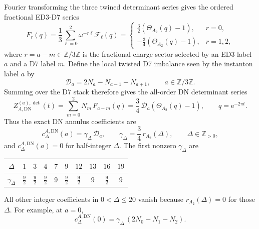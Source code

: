 \documentclass[11pt]{article}
\newcommand{\Z}{\mathbb{Z}}
\newcommand{\DN}{\mathrm{DN}}
\newcommand{\e}{\mathrm{e}}
\begin{document}
Fourier transforming the three twined determinant series gives the ordered fractional
ED3-D7 series
\begin{equation}
  F_r(q)
  =
  \frac13\sum_{\ell=0}^{2}\omega^{-r\ell}\mathcal F_\ell(q)
  =
  \begin{cases}
    \frac32\left(\Theta_{A_2}(q)-1\right), & r=0,\\[3pt]
   -\frac34\left(\Theta_{A_2}(q)-1\right), & r=1,2,
  \end{cases}
  \label{eq:fractional-DN-annulus-A2}
\end{equation}
where \(r=a-m\in\Z/3\Z\) is the fractional charge sector selected by an ED3 label \(a\) and a
D7 label \(m\). Define the local twisted D7 imbalance seen by the instanton label \(a\) by
\begin{equation}
  \mathcal D_a
  =
  2N_a-N_{a-1}-N_{a+1},
  \qquad a\in\Z/3\Z .
  \label{eq:local-D7-imbalance-Da}
\end{equation}
Summing over the D7 stack therefore gives the all-order DN determinant series
\begin{equation}
  Z_{A,\DN}^{(a),\det}(t)
  =
  \sum_{m=0}^{2}N_m\,F_{a-m}(q)
  =
  \frac34\,\mathcal D_a\left(\Theta_{A_2}(q)-1\right),
  \qquad q=\e^{-2\pi t}.
  \label{eq:DN-annulus-A2-closed-form}
\end{equation}
Thus the exact DN annulus coefficients are
\begin{equation}
  c_\Delta^{A,\DN}(a)
  =
  \gamma_\Delta\,\mathcal D_a,
  \qquad
  \gamma_\Delta=\frac34\,r_{A_2}(\Delta),
  \qquad
  \Delta\in\Z_{>0},
  \label{eq:general-DN-annulus-linear-imbalance}
\end{equation}
and \(c_\Delta^{A,\DN}(a)=0\) for half-integer \(\Delta\). The first nonzero
\(\gamma_\Delta\) are
\begin{center}
\begin{tabular}{@{}c|ccccccccc@{}}
\toprule
\(\Delta\) & \(1\) & \(3\) & \(4\) & \(7\) & \(9\) & \(12\) & \(13\) & \(16\) & \(19\) \\
\midrule
\(\gamma_\Delta\) &
\(\frac92\) & \(\frac92\) & \(\frac92\) & \(9\) & \(\frac92\) &
\(\frac92\) & \(9\) & \(\frac92\) & \(9\) \\
\bottomrule
\end{tabular}
\end{center}
All other integer coefficients in \(0<\Delta\le20\) vanish because
\(r_{A_2}(\Delta)=0\) for those \(\Delta\).
For example, at \(a=0\),
\[
  c_\Delta^{A,\DN}(0)
  =
  \gamma_\Delta\,(2N_0-N_1-N_2).
\]
\end{document}
